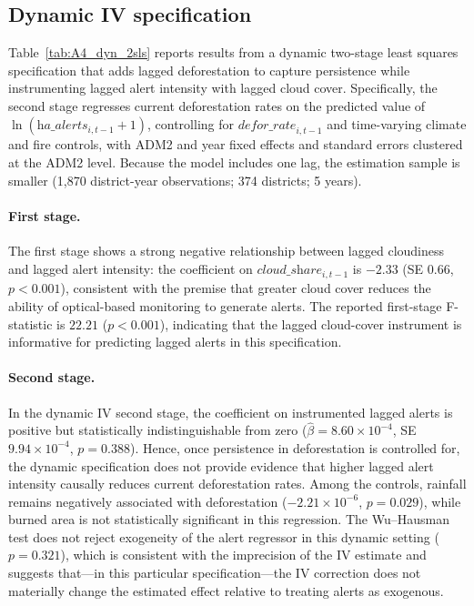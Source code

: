 \documentclass[hidelinks,12pt]{article}
\begin{document}
\subsection{Dynamic IV specification}
\label{dyniv}

Table~\ref{tab:A4_dyn_2sls} reports results from a dynamic two-stage least squares specification that adds lagged deforestation to capture persistence while instrumenting lagged alert intensity with lagged cloud cover. Specifically, the second stage regresses current deforestation rates on the predicted value of $\ln(\textit{ha\_alerts}_{i,t-1}+1)$, controlling for $\textit{defor\_rate}_{i,t-1}$ and time-varying climate and fire controls, with ADM2 and year fixed effects and standard errors clustered at the ADM2 level. Because the model includes one lag, the estimation sample is smaller (1{,}870 district-year observations; 374 districts; 5 years).


\paragraph{First stage.}
The first stage shows a strong negative relationship between lagged cloudiness and lagged alert intensity: the coefficient on $\textit{cloud\_share}_{i,t-1}$ is $-2.33$ (SE $0.66$, $p<0.001$), consistent with the premise that greater cloud cover reduces the ability of optical-based monitoring to generate alerts. The reported first-stage F-statistic is $22.21$ ($p<0.001$), indicating that the lagged cloud-cover instrument is informative for predicting lagged alerts in this specification.

\paragraph{Second stage.}
In the dynamic IV second stage, the coefficient on instrumented lagged alerts is positive but statistically indistinguishable from zero ($\hat\beta=8.60\times 10^{-4}$, SE $9.94\times 10^{-4}$, $p=0.388$). Hence, once persistence in deforestation is controlled for, the dynamic specification does not provide evidence that higher lagged alert intensity causally reduces current deforestation rates. Among the controls, rainfall remains negatively associated with deforestation ($-2.21\times 10^{-6}$, $p=0.029$), while burned area is not statistically significant in this regression. The Wu--Hausman test does not reject exogeneity of the alert regressor in this dynamic setting ($p=0.321$), which is consistent with the imprecision of the IV estimate and suggests that—in this particular specification—the IV correction does not materially change the estimated effect relative to treating alerts as exogenous.
\end{document}
